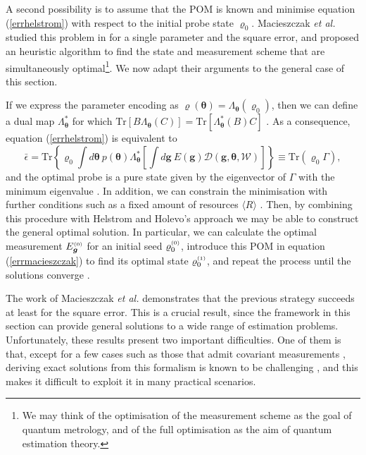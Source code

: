 A second possibility is to assume that the POM is known and minimise equation (\ref{errhelstrom}) with respect to the initial probe state $\varrho_0$. Macieszczak \emph{et al.} studied this problem in \cite{macieszczak2014bayesian} for a single parameter and the square error, and proposed an heuristic algorithm to find the state and measurement scheme that are simultaneously optimal\footnote{We may think of the optimisation of the measurement scheme as the goal of quantum metrology, and of the full optimisation as the aim of quantum estimation theory.}. We now adapt their arguments to the general case of this section. 

If we express the parameter encoding as $\varrho(\boldsymbol{\theta})=\Lambda_{\boldsymbol{\theta}} (\varrho_0)$, then we can define a dual map $\Lambda_{\boldsymbol{\theta}}^{*}$ for which $\mathrm{Tr}\left[B \Lambda_{\boldsymbol{\theta}}(C) \right] = \mathrm{Tr}\left[\Lambda_{\boldsymbol{\theta}}^{*}(B) C \right]$ \cite{macieszczak2014bayesian}. As a consequence, equation (\ref{errhelstrom}) is equivalent to
\begin{equation}
\bar{\epsilon} = \mathrm{Tr}\left\lbrace \varrho_0 \int d\boldsymbol{\theta} ~p(\boldsymbol{\theta})  \Lambda_{\boldsymbol{\theta}}^{*}\left[ \int d\boldsymbol{g}~E(\boldsymbol{g})\mathcal{D}(\boldsymbol{g},\boldsymbol{\theta}, \mathcal{W}) \right] \right\rbrace \equiv \mathrm{Tr}\left(\varrho_0 \Gamma \right),
\label{errmacieszczak} 
\end{equation}
and the optimal probe is a pure state given by the eigenvector of $\Gamma$ with the minimum eigenvalue \cite{macieszczak2014bayesian}. In addition, we can constrain the minimisation with further conditions such as a fixed amount of resources $\langle R \rangle$ \cite{ariano1998}. Then, by combining this procedure with Helstrom and Holevo's approach we may be able to construct the general optimal solution. In particular, we can calculate the optimal measurement $E^{\text{\tiny{(0)}}}_{\boldsymbol{g}}$ for an initial seed $\varrho_0^{\text{\tiny{(0)}}}$, introduce this POM in equation (\ref{errmacieszczak}) to find its optimal state $\varrho_0^{\text{\tiny{(1)}}}$, and repeat the process until the solutions converge \cite{macieszczak2014bayesian}.

The work of Macieszczak \emph{et al.} \cite{macieszczak2014bayesian} demonstrates that the previous strategy succeeds at least for the square error. This is a crucial result, since the framework in this section can provide general solutions to a wide range of estimation problems. Unfortunately, these results present two important difficulties. One of them is that, except for a few cases such as those that admit covariant measurements \cite{ariano1998, chiara2003, chiribella2005, holevo2011, rafal2015}, deriving exact solutions from this formalism is known to be challenging \cite{helstrom1976}, and this makes it difficult to exploit it in many practical scenarios. 

